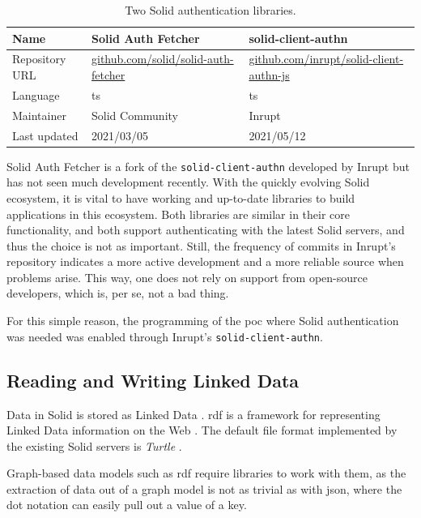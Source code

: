 \begin{table}[h!]
    \centering
    \begin{tabular}{| l | l | l |} 
     \hline
     Name & Solid Auth Fetcher & solid-client-authn \\
     \hline
     Repository URL & \url{github.com/solid/solid-auth-fetcher} & \url{github.com/inrupt/solid-client-authn-js} \\
     \hline
     Language & \gls{ts} & \gls{ts} \\
     \hline
     Maintainer & Solid Community & Inrupt \\
     \hline
     Last updated & 2021/03/05 & 2021/05/12 \\
     \hline
    \end{tabular}
    \vspace{0.75cm}
    \caption{Two Solid authentication libraries.}
    \label{table:0}
\end{table}

Solid Auth Fetcher is a fork of the \texttt{solid-client-authn} developed by Inrupt but has not seen much development recently. With the quickly evolving Solid ecosystem, it is vital to have working and up-to-date libraries to build applications in this ecosystem. Both libraries are similar in their core functionality, and both support authenticating with the latest Solid servers, and thus the choice is not as important. Still, the frequency of commits in Inrupt's repository indicates a more active development and a more reliable source when problems arise. This way, one does not rely on support from open-source developers, which is, per se, not a bad thing.

For this simple reason, the programming of the \gls{poc} where Solid authentication was needed was enabled through Inrupt's \texttt{solid-client-authn}.

\subsection{Reading and Writing Linked Data}

Data in Solid is stored as Linked Data \cite{Malhotra:15:LDP}. \gls{rdf} is a framework for representing Linked Data information on the Web \cite{Cyganiak:14:RCA}. The default file format implemented by the existing Solid servers is \textit{Turtle} \cite{Prud:hommeaux:14:RT}.

Graph-based data models such as \gls{rdf} require libraries to work with them, as the extraction of data out of a graph model is not as trivial as with \gls{json}, where the dot notation can easily pull out a value of a key.

